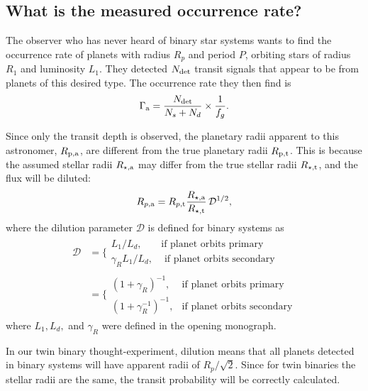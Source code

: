 \documentclass{emulateapj}
\begin{document}
\subsection{What is the measured occurrence rate?}

The observer who has never heard of binary star systems wants to find the 
occurrence rate of planets with radius $R_p$ and period $P$, orbiting stars of 
radius $R_1$ and luminosity $L_1$.
They detected $N_{\rm det}$ transit signals that appear to be from planets of 
this desired type.
The occurrence rate they then find is
\begin{equation}
\Gamma_{\rm a } = \frac{N_{\rm det}}{N_s + N_d} \times \frac{1}{f_g}.
\end{equation}

Since only the transit depth is observed, the planetary radii apparent to this 
astronomer, $R_{\rm p, a}$, are different from the true planetary radii 
$R_{\rm p, t}$. 
This is because the assumed stellar radii $R_{\star,{\rm a}}$ may differ from 
the true stellar radii $R_{\star,{\rm t}}$, and the flux will be diluted:
\begin{equation}
R_{p,{\rm a}} = R_{p,{\rm t}} 
\frac{R_{\star,{\rm a}}}
		 {R_{\star,{\rm t}}}
		 \,\mathcal{D}^{1/2},
\end{equation}
where the dilution parameter $\mathcal{D}$ is defined for binary systems as
\begin{align}
\mathcal{D} &= 
\Bigg\{\begin{array}{lr}
L_1 / L_d, & \text{if\ planet\ orbits\ primary}\\
\gamma_R L_1 / L_d, & \text{\ if\ planet\ orbits\ secondary}
\end{array} \nonumber\\
&=
\Bigg\{\begin{array}{lr}
(1+\gamma_R)^{-1}, & \text{if\ planet\ orbits\ primary}\\
(1 + \gamma_R^{-1})^{-1}, & \text{if\ planet\ orbits\ secondary}
\end{array} 
\label{eq:dilution}
\end{align}
where $L_1, L_d,$ and $\gamma_R$ were defined in the opening monograph.


In our twin binary thought-experiment, dilution means that all planets 
detected in binary systems will have apparent radii of $R_p/\sqrt{2}$.
Since for twin binaries the stellar radii are the same, the transit 
probability will be correctly calculated.
\end{document}
